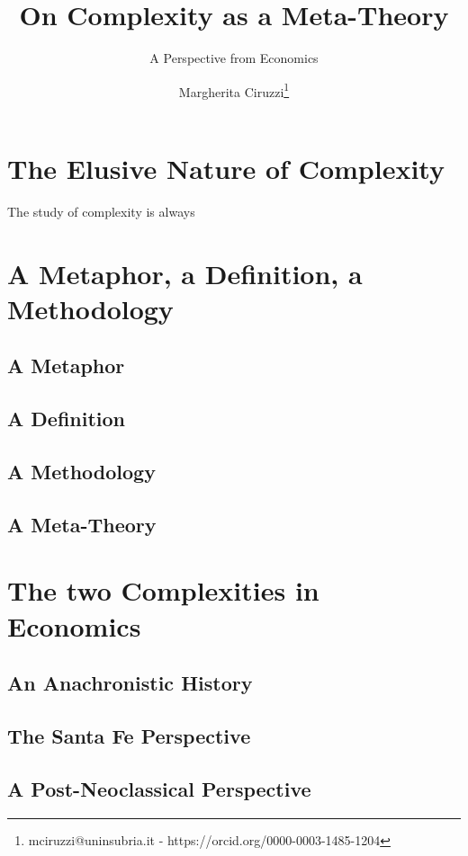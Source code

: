 \documentclass[a4paper, headings=standardclasses]{scrartcl}
\title{On Complexity as a Meta-Theory}
\subtitle{A Perspective from Economics}
\author{Margherita Ciruzzi\thanks{mciruzzi@uninsubria.it - https://orcid.org/0000-0003-1485-1204}}
\begin{document}
\maketitle

\begin{abstract}

\end{abstract}

\section{The Elusive Nature of Complexity}
The study of complexity is always

\section{A Metaphor, a Definition, a Methodology}
\subsection{A Metaphor}

\subsection{A Definition}

\subsection{A Methodology}

\subsection{A Meta-Theory}

\section{The two Complexities in Economics}
\subsection{An Anachronistic History}

\subsection{The Santa Fe Perspective}

\subsection{A Post-Neoclassical Perspective}
\end{document}
